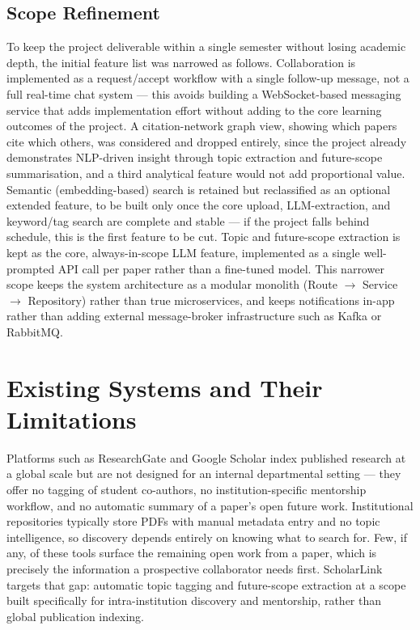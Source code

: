 \documentclass[11pt]{article}
\begin{document}
\subsection{Scope Refinement}
To keep the project deliverable within a single semester without losing academic depth, the initial feature list was narrowed as follows. Collaboration is implemented as a request/accept workflow with a single follow-up message, not a full real-time chat system --- this avoids building a WebSocket-based messaging service that adds implementation effort without adding to the core learning outcomes of the project. A citation-network graph view, showing which papers cite which others, was considered and dropped entirely, since the project already demonstrates NLP-driven insight through topic extraction and future-scope summarisation, and a third analytical feature would not add proportional value. Semantic (embedding-based) search is retained but reclassified as an optional extended feature, to be built only once the core upload, LLM-extraction, and keyword/tag search are complete and stable --- if the project falls behind schedule, this is the first feature to be cut. Topic and future-scope extraction is kept as the core, always-in-scope LLM feature, implemented as a single well-prompted API call per paper rather than a fine-tuned model. This narrower scope keeps the system architecture as a modular monolith (Route $\rightarrow$ Service $\rightarrow$ Repository) rather than true microservices, and keeps notifications in-app rather than adding external message-broker infrastructure such as Kafka or RabbitMQ.

\section{Existing Systems and Their Limitations}
Platforms such as ResearchGate and Google Scholar index published research at a global scale but are not designed for an internal departmental setting --- they offer no tagging of student co-authors, no institution-specific mentorship workflow, and no automatic summary of a paper's open future work. Institutional repositories typically store PDFs with manual metadata entry and no topic intelligence, so discovery depends entirely on knowing what to search for. Few, if any, of these tools surface the remaining open work from a paper, which is precisely the information a prospective collaborator needs first. ScholarLink targets that gap: automatic topic tagging and future-scope extraction at a scope built specifically for intra-institution discovery and mentorship, rather than global publication indexing.
\end{document}
